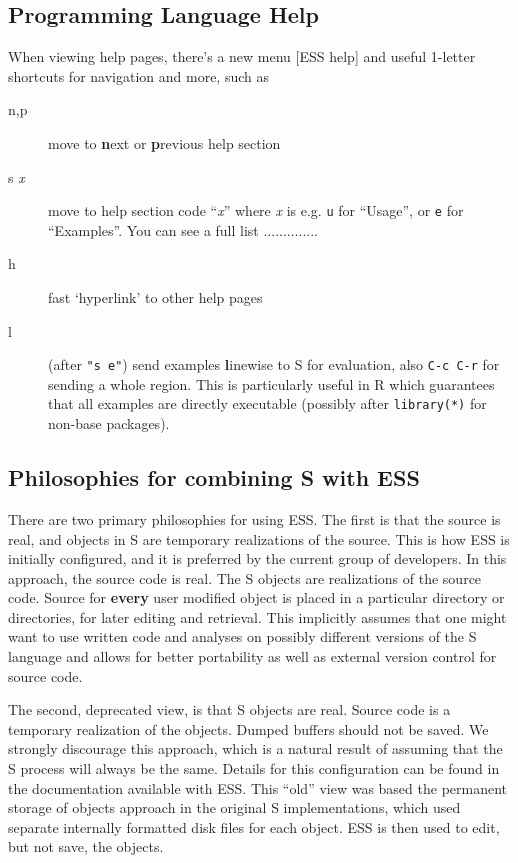 \documentclass{article}
\newenvironment{Salltt}{\small\begin{alltt}}{\end{alltt}}
\begin{document}
\subsection{Programming Language Help}
\label{sec:S:help}

When viewing help pages, there's a new menu \textsf{[ESS help]} and
useful 1-letter shortcuts for navigation and more, such as
\begin{description}
\item[n,p] move to \textbf{n}ext or \textbf{p}revious help section
\item[s \textit{x}] move to help section code ``\textit{x}'' where
  \textit{x} is e.g. \texttt{u} for ``Usage'', or \texttt{e} for
  ``Examples''.  You can see a full list ..............
\item[h] fast `hyperlink' to other help pages
\item[l] (after \texttt{"s e"}) send examples \textbf{l}inewise to S for
  evaluation, also \texttt{C-c C-r} for sending a whole region.  This 
  is particularly useful in R which guarantees that all examples are
  directly executable (possibly after \texttt{library(*)} for non-base
  packages).
\end{description}

\subsection{Philosophies for combining S with ESS}
\label{sec:S:philosophy}

There are two primary philosophies for using ESS.  The first is that
the source is real, and objects in S are temporary realizations of the
source.  This is how ESS is initially configured, and it is preferred
by the current group of developers.  In this approach, the source code
is real.  The S objects are realizations of the source code.  Source
for \textbf{every} user modified object is placed in a particular
directory or directories, for later editing and retrieval.  This
implicitly assumes that one might want to use written code and
analyses on possibly different versions of the S language and allows
for better portability as well as external version control for source
code.

The second, deprecated view, is that S objects are real.  Source code
is a temporary realization of the objects.  Dumped buffers
should not be saved.  We strongly discourage this approach, which is a
natural result of assuming that the S process will always be the
same.  Details for this configuration can be found in the
documentation available with ESS.
This ``old'' view was based the permanent storage of objects approach
in the original S implementations, which used separate internally
formatted disk files for each object.  ESS is then used to edit, but
not save, the objects.
\end{document}
